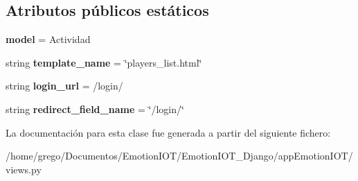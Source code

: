 \subsection*{Atributos públicos estáticos}
\begin{DoxyCompactItemize}
\item 
{\bfseries model} = Actividad\hypertarget{classappEmotionIOT_1_1views_1_1Actividads__list_a74260206eeb9dd77092be645058dd576}{}\label{classappEmotionIOT_1_1views_1_1Actividads__list_a74260206eeb9dd77092be645058dd576}

\item 
string {\bfseries template\+\_\+name} = \char`\"{}players\+\_\+list.\+html\char`\"{}\hypertarget{classappEmotionIOT_1_1views_1_1Actividads__list_aa5dbe72b7c776453b8ae1ceb367b2135}{}\label{classappEmotionIOT_1_1views_1_1Actividads__list_aa5dbe72b7c776453b8ae1ceb367b2135}

\item 
string {\bfseries login\+\_\+url} = \textquotesingle{}/login/\textquotesingle{}\hypertarget{classappEmotionIOT_1_1views_1_1Actividads__list_a2acaf72f8aeec503cd6d220f80629b8f}{}\label{classappEmotionIOT_1_1views_1_1Actividads__list_a2acaf72f8aeec503cd6d220f80629b8f}

\item 
string {\bfseries redirect\+\_\+field\+\_\+name} = \char`\"{}/login/\char`\"{}\hypertarget{classappEmotionIOT_1_1views_1_1Actividads__list_ac4cacb4d829b61b0c8b0976b3ec2b177}{}\label{classappEmotionIOT_1_1views_1_1Actividads__list_ac4cacb4d829b61b0c8b0976b3ec2b177}

\end{DoxyCompactItemize}


La documentación para esta clase fue generada a partir del siguiente fichero\+:\begin{DoxyCompactItemize}
\item 
/home/grego/\+Documentos/\+Emotion\+I\+O\+T/\+Emotion\+I\+O\+T\+\_\+\+Django/app\+Emotion\+I\+O\+T/views.\+py\end{DoxyCompactItemize}
